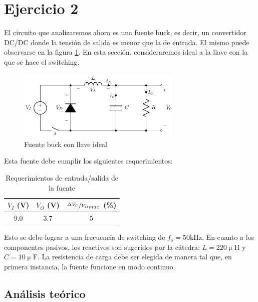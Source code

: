 \documentclass[e4_tp1_main.tex]{subfiles}
\begin{document}
\section{Ejercicio 2}


El circuito que analizaremos ahora es una fuente buck, es decir, un convertidor DC/DC donde la tensi\'on de salida es menor que la de entrada. El mismo puede observarse en la figura \ref{fig:buck-ideal}. En esta secci\'on, consideraremos ideal a la llave con la que se hace el switching.


\begin{figure}[ht]
	\centering
	
	\includegraphics[width=0.7\textwidth]{images/ej2/buck_ideal.pdf}
	\caption{Fuente buck con llave ideal}
	\label{fig:buck-ideal}
\end{figure}


Esta fuente debe cumplir los siguientes requerimientos:

\begin{table}[ht]
	\centering
	\begin{tabular}{c|c|c}
		$V_I$ (V) & $V_O$ (V) & $\nicefrac{\Delta V_O}{V_O}_{max}$ (\%) \\ \hline
		9.0       & 3.7       & 5                                       \\ 
	\end{tabular}
	\caption{Requerimientos de entrada/salida de la fuente}
	\label{tab:vin-vout}
\end{table}


Esto se debe lograr a una frecuencia de switching de $f_s = 50$kHz. En cuanto a los componentes pasivos, los reactivos son sugeridos por la c\'atedra: $L=220\upmu$H y $C=10\upmu$F. La resistencia de carga  debe ser elegida de manera tal que, en primera instancia, la fuente funcione en modo continuo.



\subsection{An\'alisis te\'orico}
\end{document}

